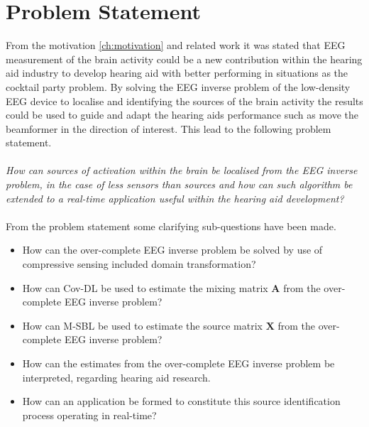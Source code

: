 \chapter{Problem Statement}
From the motivation \ref{ch:motivation} and related work it was stated that EEG measurement of the brain activity could be a new contribution within the hearing aid industry to develop hearing aid with better performing in situations as the cocktail party problem. By solving the EEG inverse problem of the low-density EEG device to localise and identifying the sources of the brain activity the results could be used to guide and adapt the hearing aids performance such as move the beamformer in the direction of interest. This lead to the following problem statement.
\\ \\
\textit{How can sources of activation within the brain be localised from the EEG inverse problem, in the case of less sensors than sources and how can such algorithm be extended to a real-time application useful within the hearing aid development?}
\\ \\
From the problem statement some clarifying sub-questions have been made.
\begin{itemize}
\item How can the over-complete EEG inverse problem be solved by use of compressive sensing included domain transformation?
\item How can Cov-DL be used to estimate the mixing matrix $\mathbf{A}$ from the over-complete EEG inverse problem?
\item How can M-SBL be used to estimate the source matrix $\mathbf{X}$ from the over-complete EEG inverse problem?
\item How can the estimates from the over-complete EEG inverse problem be interpreted, regarding hearing aid research. 
\item How can an application be formed to constitute this source identification process operating in real-time?
\end{itemize}

